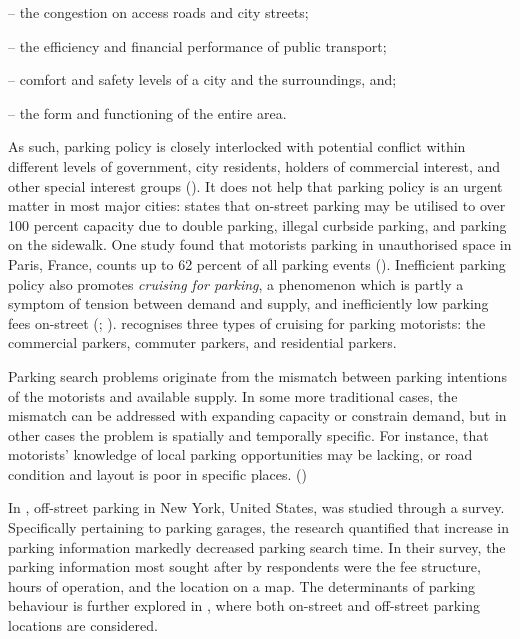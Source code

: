 \begin{itemize}
    \begin{singlespace}
        \item[--] the congestion on access roads and city streets;
        \item[--] the efficiency and financial performance of public transport;
        \item[--] comfort and safety levels of a city and the surroundings, and;
        \item[--] the form and functioning of the entire area.
    \end{singlespace}
\end{itemize}

As such, parking policy is closely interlocked with potential conflict within different levels of government, city residents, holders of commercial interest, and other special interest groups (\cite{Ker1988}). It does not help that parking policy is an urgent matter in most major cities:  states that on-street parking may be utilised to over 100 percent capacity due to double parking, illegal curbside parking, and parking on the sidewalk. One study found that motorists parking in unauthorised space in Paris, France, counts up to 62 percent of all parking events (\cite{Gantelet2006}). Inefficient parking policy also promotes \textit{cruising for parking}, a phenomenon which is partly a symptom of tension between demand and supply, and inefficiently low parking fees on-street (\cite{Shoup2004}; \citeyear{Shoup2006}).  recognises three types of cruising for parking motorists: the commercial parkers, commuter parkers, and residential parkers.

Parking search problems originate from the mismatch between parking intentions of the motorists and available supply. In some more traditional cases, the mismatch can be addressed with expanding capacity or constrain demand, but in other cases the problem is spatially and temporally specific. For instance, that motorists' knowledge of local parking opportunities may be lacking, or road condition and layout is poor in specific places. (\cite{Axhausen1993})

In , off-street parking in New York, United States, was studied through a survey. Specifically pertaining to parking garages, the research quantified that increase in parking information markedly decreased parking search time. In their survey, the parking information most sought after by respondents were the fee structure, hours of operation, and the location on a map. The determinants of parking behaviour is further explored in , where both on-street and off-street parking locations are considered.

